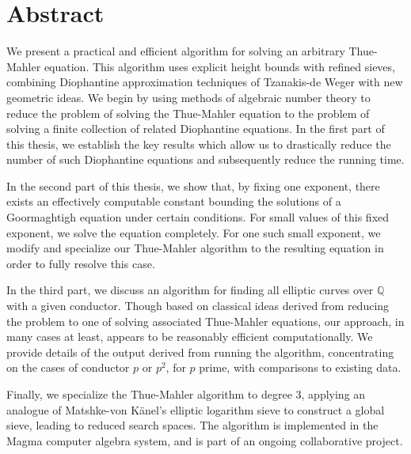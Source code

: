 
\chapter{Abstract}

We present a practical and efficient algorithm for solving an arbitrary Thue-Mahler equation. This algorithm uses explicit height bounds with refined sieves, combining Diophantine approximation techniques of Tzanakis-de Weger with new geometric ideas. We begin by using methods of algebraic number theory to reduce the problem of solving the Thue-Mahler equation to the problem of solving a finite collection of related Diophantine equations. In the first part of this thesis, we establish the key results which allow us to drastically reduce the number of such Diophantine equations and subsequently reduce the running time. 

In the second part of this thesis, we show that, by fixing one exponent, there exists an effectively computable constant bounding the solutions of a Goormaghtigh equation under certain conditions. For small values of this fixed exponent, we solve the equation completely. For one such small exponent, we modify and specialize our Thue-Mahler algorithm to the resulting equation in order to fully resolve this case.

In the third part, we discuss an algorithm for finding all elliptic curves over $\mathbb{Q}$ with a given conductor. Though based on 
classical ideas derived from reducing the problem to one of solving associated Thue-Mahler equations,  our approach, in many cases at least, appears to be reasonably efficient  computationally. We provide 
details of the output derived from running the algorithm, concentrating on the cases of conductor $p$ or $p^2$, for $p$ prime, with comparisons to existing 
data. 

Finally, we specialize the Thue-Mahler algorithm to degree $3$, applying an analogue of Matshke-von K\"anel's elliptic logarithm sieve to construct a global sieve, leading to reduced search spaces. The algorithm is implemented in the Magma computer algebra system, and is part of an ongoing collaborative project. 




